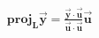 \documentclass[preview]{standalone}
\begin{document}
\begin{align*}
\textbf{proj}_{\mathbf{L}}\mathbf{\vec{y}} = \frac{\mathbf{\vec{y}} \cdot \mathbf{\vec{u}}}{\mathbf{\vec{u}} \cdot \mathbf{\vec{u}}} \mathbf{\vec{u}}
\end{align*}
\end{document}

